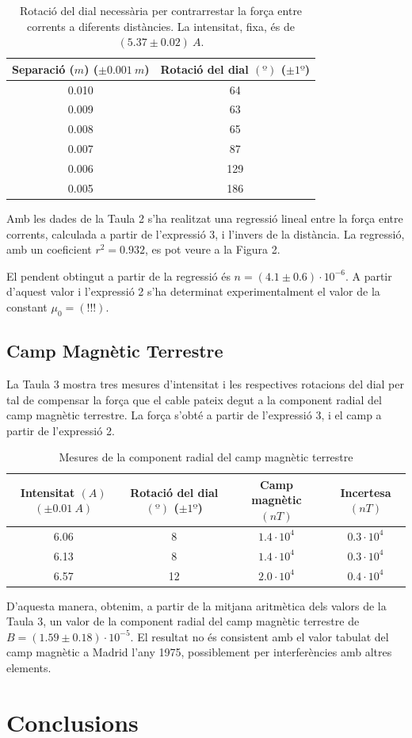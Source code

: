 \documentclass[a4paper,11pt]{article}
\begin{document}
\begin{table}
	\centering
	\caption{Rotació del dial necessària per contrarrestar la força entre corrents a diferents distàncies. La intensitat, fixa, és de $(5.37\pm0.02)\ \si{A}$.}
	\vspace{0.5cm}
	\begin{tabular}{|c|c|}
		\hline
		\textbf{Separació ($\si{m}$) ($\pm 0.001\ \si{m}$)}&\textbf{Rotació del dial} $\si{(º)}$ ($\pm 1º$) \\ \hline
		0.010 & 64  \\ \hline
		0.009 & 63  \\ \hline 
		0.008 & 65 \\ \hline 
		0.007 & 87  \\ \hline 
		0.006 & 129  \\ \hline  
		0.005 & 186  \\ \hline  
	\end{tabular}
\end{table}
Amb les dades de la Taula 2 s'ha realitzat una regressió lineal entre la força entre corrents, calculada a partir de l'expressió 3, i l'invers de la distància. La regressió, amb un coeficient $r^2=0.932$, es pot veure a la Figura 2.

El pendent obtingut a partir de la regressió és $n=(4.1\pm0.6)\cdot10^{-6}$. A partir d'aquest valor i l'expressió 2 s'ha determinat experimentalment el valor de la constant $\mu_0=(!!!)$.

\subsection{Camp Magnètic Terrestre}
La Taula 3 mostra tres mesures d'intensitat i les respectives rotacions del dial per tal de compensar la força que el cable pateix degut a la component radial del camp magnètic terrestre. La força s'obté a partir de l'expressió 3, i el camp a partir de l'expressió 2.

\begin{table}
	\centering
	\caption{Mesures de la component radial del camp magnètic terrestre}
	\vspace{0.5cm}
	\begin{tabular}{|c|c|c|c|}
		\hline
		\textbf{Intensitat} $\si{(A)}$ $(\pm0.01\ \si{A})$&\textbf{Rotació del dial} $\si{(º)}$ ($\pm 1º$)&\textbf{Camp magnètic} $\si{(nT)}$ & \textbf{Incertesa} $\si{(nT)}$\\ \hline
		6.06 & 8 &$1.4\cdot10^{4}$ & $0.3\cdot10^{4}$ \\ \hline
		6.13 & 8  &$1.4\cdot10^{4}$  &$0.3\cdot10^{4}$ \\ \hline 
		6.57 & 12 &$2.0\cdot10^{4}$  &$0.4\cdot10^{4}$ \\ \hline 

	\end{tabular}
\end{table}
D'aquesta manera, obtenim, a partir de la mitjana aritmètica dels valors de la Taula 3, un valor de la component radial del camp magnètic terrestre de $B=(1.59\pm0.18)\cdot10^{-5}$. El resultat no és consistent amb el valor tabulat del camp magnètic a Madrid l'any 1975, possiblement per interferències amb altres elements.

\section{Conclusions}
\end{document}

